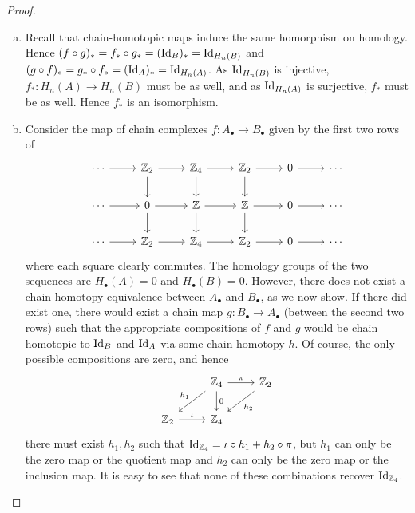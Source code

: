 \documentclass{../../mathnotes}
\begin{document}
\begin{proof}\hfill
    \begin{enumerate}[(a)]
        \item Recall that chain-homotopic maps induce the same homorphism on homology. Hence $(f\circ g)_*=f_*\circ g_*=(\operatorname{Id}_B)_*=\operatorname{Id}_{H_n(B)}$
            and $(g\circ f)_*=g_*\circ f_*=(\operatorname{Id}_A)_*=\operatorname{Id}_{H_n(A)}$. As $\operatorname{Id}_{H_n(B)}$ is injective, $f_*:H_n(A)\to H_n(B)$ must be as well, and 
            as $\operatorname{Id}_{H_n(A)}$ is surjective, $f_*$ must be as well. Hence $f_*$ is an isomorphism.
        \item Consider the map of chain complexes $f:A_\bullet\to B_\bullet$ given by the first two rows of
            \begin{equation*}
                \begin{tikzcd}
                    \cdots\ar{r} & \Z_2\ar{r}\ar{d} & \Z_4\ar{r}\ar{d} & \Z_2\ar{r}\ar{d} & 0\ar{r} & \cdots\\
                    \cdots\ar{r}&0\ar{r}\ar{d}&\Z\ar{r}\ar{d}&\Z\ar{r}\ar{d}&0\ar{r}&\cdots\\
                    \cdots\ar{r} & \Z_2\ar{r} & \Z_4\ar{r} & \Z_2\ar{r} & 0\ar{r} & \cdots
                \end{tikzcd}
            \end{equation*}
            where each square clearly commutes. The homology groups of the two sequences are $H_\bullet(A)=0$ and $H_\bullet(B)=0$.
            However, there does not exist a chain homotopy equivalence between $A_\bullet$ and $B_\bullet$, as we now show.
            If there did exist one, there would exist a chain map $g:B_\bullet\to A_\bullet$ (between the second two rows)
            such that the appropriate compositions
            of $f$ and $g$ would be chain homotopic to $\operatorname{Id}_B$ and $\operatorname{Id}_A$ via some chain homotopy $h$. Of course, the only possible
            compositions are zero, and hence 
            \begin{equation*}
                \begin{tikzcd}
                    {} & \Z_4\ar{r}{\pi}\ar[swap]{dl}{h_1}\ar{d}{0} & \Z_2\ar{dl}{h_2}\\
                    \Z_2\ar{r}{\iota} & \Z_4 &
                \end{tikzcd}
            \end{equation*}
            there must exist $h_1,h_2$ such that $\operatorname{Id}_{\mathbb{Z}_4}=\iota\circ h_1+h_2\circ\pi$, but $h_1$ can only be the zero map
            or the quotient map and $h_2$ can only be the zero map or the inclusion map. It is easy to see that none of these
            combinations recover $\operatorname{Id}_{\mathbb{Z}_4}$.
    \end{enumerate}
\end{proof}
\end{document}
